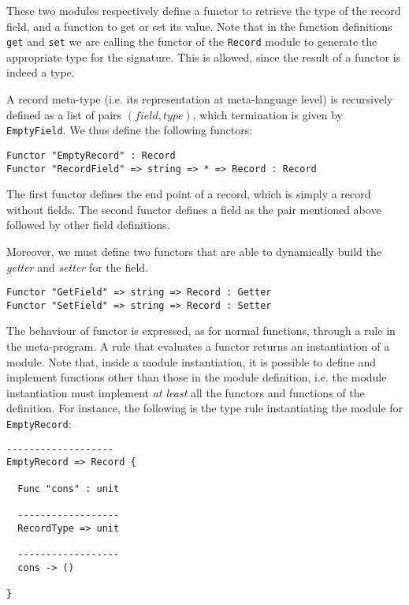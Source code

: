 \noindent
These two modules respectively define a functor to retrieve the type of the record field, and a function to get or set its value. Note that in the function definitions \texttt{get} and \texttt{set} we are calling the functor of the \texttt{Record} module to generate the appropriate type for the signature. This is allowed, since the result of a functor is indeed a type.

A record meta-type (i.e. its representation at meta-language level) is recursively defined as a list of pairs $(field,type)$, which termination is given by \texttt{EmptyField}. We thus define the following functors:

\begin{lstlisting}
Functor "EmptyRecord" : Record
Functor "RecordField" => string => * => Record : Record
\end{lstlisting}

\noindent
The first functor defines the end point of a record, which is simply a record without fields. The second functor defines a field as the pair mentioned above followed by other field definitions.

Moreover, we must define two functors that are able to dynamically build the \textit{getter} and \textit{setter} for the field.

\begin{lstlisting}
Functor "GetField" => string => Record : Getter
Functor "SetField" => string => Record : Setter
\end{lstlisting}

The behaviour of functor is expressed, as for normal functions, through a rule in the meta-program. A rule that evaluates a functor returns an instantiation of a module. Note that, inside a module instantiation, it is possible to define and implement functions other than those in the module definition, i.e. the module instantiation must implement \textit{at least} all the functors and functions of the definition. For instance, the following is the type rule instantiating the module for \texttt{EmptyRecord}:

\begin{lstlisting}
-------------------
EmptyRecord => Record {

  Func "cons" : unit

  ------------------
  RecordType => unit

  ------------------
  cons -> ()

}
\end{lstlisting}

